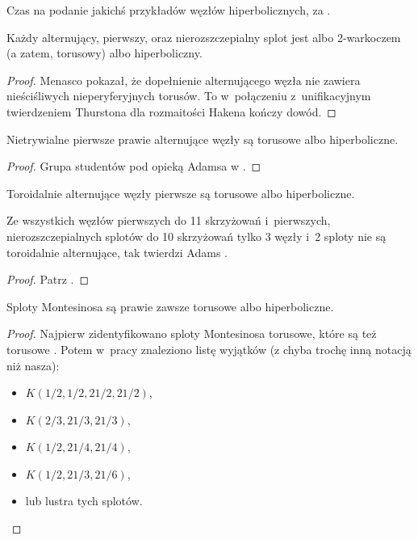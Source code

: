 Czas na podanie jakichś przykładów węzłów hiperbolicznych, za \cite{adams05}.

\begin{proposition}
    Każdy alternujący, pierwszy, oraz nierozszczepialny splot jest albo 2-warkoczem (a zatem, torusowy) albo hiperboliczny.
\end{proposition}

\begin{proof}
    Menasco \cite{menasco84} pokazał, że dopełnienie alternującego węzła nie zawiera nieściśliwych  nieperyferyjnych torusów.
    To w~połączeniu z~unifikacyjnym twierdzeniem Thurstona dla rozmaitości Hakena kończy dowód.
\end{proof}

\begin{proposition}
    Nietrywialne pierwsze prawie alternujące węzły są torusowe albo hiperboliczne.
\end{proposition}

\begin{proof}
    Grupa studentów pod opieką Adamsa w \cite{brock92}.
\end{proof}

\begin{proposition}
    Toroidalnie alternujące węzły pierwsze są torusowe albo hiperboliczne.
\end{proposition}

Ze wszystkich węzłów pierwszych do 11 skrzyżowań i~pierwszych, nierozszczepialnych splotów do 10 skrzyżowań tylko 3 węzły i~2 sploty nie są toroidalnie alternujące, tak twierdzi Adams \cite{adams05}.

\begin{proof}
    Patrz \cite{adams994}.
\end{proof}

\begin{proposition}
    Sploty Montesinosa są prawie zawsze torusowe albo hiperboliczne.
\end{proposition}

\begin{proof}
    Najpierw zidentyfikowano sploty Montesinosa torusowe, które są też torusowe \cite{boileau80}.
    Potem w~pracy \cite{oertel84} znaleziono listę wyjątków (z chyba trochę inną notacją niż nasza):
    \begin{itemize}
        \item $K(1/2, 1/2, 21/2, 21/2)$,
        \item $K(2/3, 21/3, 21/3)$, 
        \item $K(1/2, 21/4, 21/4)$, 
        \item $K(1/2, 21/3, 21/6)$,
        \item lub lustra tych splotów. \qedhere
    \end{itemize}
\end{proof}

